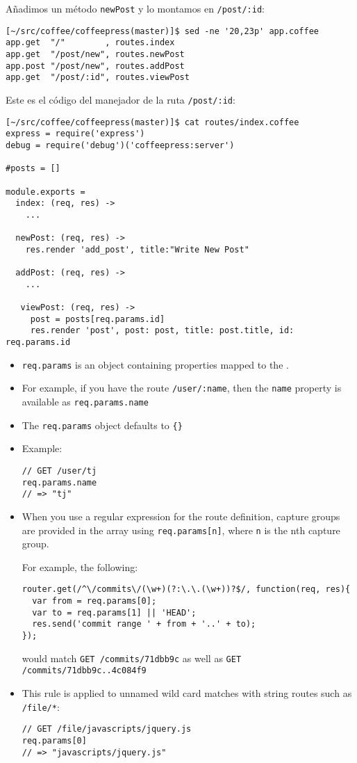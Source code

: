 
Añadimos un método \verb|newPost| y lo montamos en \verb|/post/:id|:
\begin{verbatim}
[~/src/coffee/coffeepress(master)]$ sed -ne '20,23p' app.coffee 
app.get  "/"        , routes.index
app.get  "/post/new", routes.newPost
app.post "/post/new", routes.addPost
app.get  "/post/:id", routes.viewPost
\end{verbatim}
Este es el código del manejador de la ruta \verb|/post/:id|:
\begin{verbatim}
[~/src/coffee/coffeepress(master)]$ cat routes/index.coffee 
express = require('express')
debug = require('debug')('coffeepress:server')

#posts = []

module.exports = 
  index: (req, res) ->
    ...

  newPost: (req, res) ->
    res.render 'add_post', title:"Write New Post"

  addPost: (req, res) ->
    ...

   viewPost: (req, res) ->
     post = posts[req.params.id]
     res.render 'post', post: post, title: post.title, id: req.params.id
\end{verbatim}
\begin{itemize}
\item
\verb|req.params| is an object containing properties mapped to the 
. 
\item
For example, if you have the route \verb|/user/:name|, then the \verb|name| property is available as 
\verb|req.params.name| 
\item
The \verb|req.params| object defaults to \verb|{}|
\item
Example:
\begin{verbatim}
// GET /user/tj
req.params.name
// => "tj"
\end{verbatim}
\item
When you use a regular expression for the route definition, capture groups are provided in the array using 
\verb|req.params[n]|, where \verb|n| is the nth capture group. 

For example, the following:
\begin{verbatim}
router.get(/^\/commits\/(\w+)(?:\.\.(\w+))?$/, function(req, res){
  var from = req.params[0];
  var to = req.params[1] || 'HEAD';
  res.send('commit range ' + from + '..' + to);
});
\end{verbatim}
would match \verb|GET /commits/71dbb9c| as well as \verb|GET /commits/71dbb9c..4c084f9|
\item
This rule is applied to unnamed wild card
matches with string routes such as \verb|/file/*|:
\begin{verbatim}
// GET /file/javascripts/jquery.js
req.params[0]
// => "javascripts/jquery.js"
\end{verbatim}
\end{itemize}
